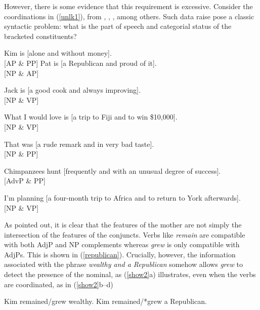 \documentclass[output=paper]{langsci/langscibook}
\begin{document}
\noindent
However, there is some evidence that this requirement is excessive.  Consider the coordinations in (\ref{unlk1}), from
\citet{gpsg}, \citet{bayer}, \citet{rodney2}, among  others.
 Such data raise pose a classic syntactic problem: 
what is the part of speech and categorial status of the bracketed constituents?


\begin{exe}
\ex \begin{xlista}
\ex Kim is  [alone and without money].\\
 \hfill [AP \& PP]
\ex  Pat is [a Republican and proud of it]. \\
 \hfill [NP \& AP]

\ex  Jack is [a good cook and always improving].\\ \hfill [NP \& VP]

\ex What I would love is [a trip to Fiji and to win \$10,000].\\
\hfill [NP \& VP]

\ex  That was [a rude remark and in very bad taste]. \\
\hfill [NP \& PP]

\ex Chimpanzees hunt [frequently and with an unusual degree of success].\\
\hfill [AdvP \& PP]

\ex I'm  planning [a four-month trip to Africa and  to return to York afterwards].\\
\hfill [NP \& VP]
 \end{xlista}\label{unlk1}
\end{exe}


\noindent
As  \citet{jacobson} pointed out, it is clear that the features of the mother are not simply the intersection of the features of the conjuncts. Verbs like \emph{remain} are compatible with both
AdjP and NP complements whereas \emph{grew}
is only compatible with AdjPs.
This is shown in  (\ref{republican}).
Crucially, however, the information associated with
the phrase \emph{wealthy and a Republican}
somehow allows \emph{grew} to detect the presence of
the nominal, as (\ref{show2}a) illustrates, even
when the verbs
are coordinated, as in (\ref{show2}b--d)


\begin{exe}
\ex
\begin{xlista}
\ex  Kim remained/grew wealthy.
\ex  Kim remained/*grew a Republican.
\end{xlista}\label{republican}
\end{exe}
\end{document}
